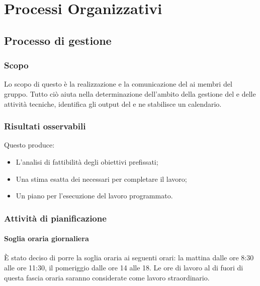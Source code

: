 \section{Processi Organizzativi}


\subsection{Processo di gestione}

\subsubsection{Scopo}

Lo scopo di questo  è la realizzazione e la comunicazione del \PianoDiProgetto ai membri del gruppo. Tutto ciò aiuta nella determinazione dell'ambito della gestione del  e delle attività tecniche, identifica gli output del  e ne stabilisce un calendario.

\subsubsection{Risultati osservabili}

Questo  produce:
\begin{itemize}

\item L'analisi di fattibilità degli obiettivi prefissati;
\item Una stima esatta dei  necessari per completare il lavoro;
\item Un piano per l'esecuzione del lavoro programmato.

\end{itemize}

\subsubsection{Attività di pianificazione}

\paragraph*{Soglia oraria giornaliera} È stato deciso di porre la soglia oraria ai seguenti orari: la mattina dalle ore 8:30 alle ore 11:30, il pomeriggio dalle ore 14 alle 18. Le ore di lavoro al di fuori di questa fascia oraria saranno considerate come lavoro straordinario.

